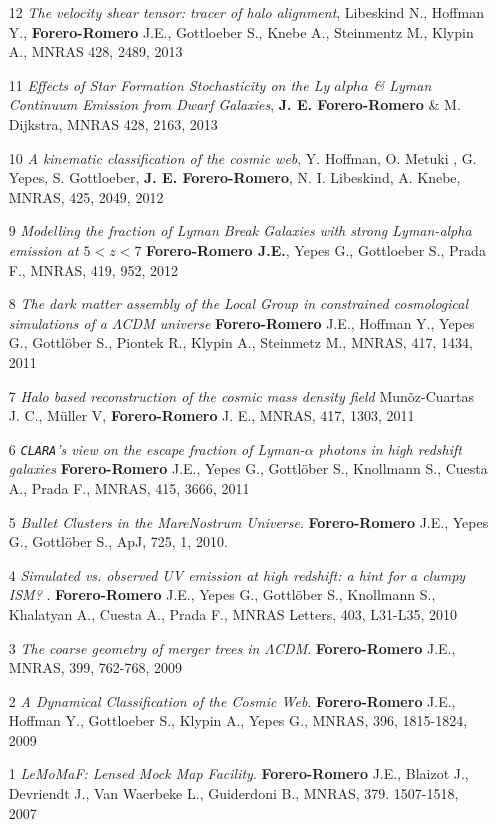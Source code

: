 \documentclass[9pt]{article}
\begin{document}
\begin{enumerate}
\item[12] {\it The velocity shear tensor: tracer of halo alignment},
  Libeskind N., Hoffman Y., {\bf Forero-Romero} J.E., Gottloeber S.,
  Knebe A., Steinmentz M., Klypin A., MNRAS 428, 2489, 2013 

\item[11] {\it Effects of Star Formation Stochasticity on the Ly
  $alpha$ \& Lyman Continuum Emission from Dwarf Galaxies}, {\bf
  J. E. Forero-Romero} \& M. Dijkstra, MNRAS 428, 2163, 2013 

\item[10] {\it A kinematic classification of the cosmic web},
  Y. Hoffman, O. Metuki , G. Yepes, S. Gottloeber, {\bf
    J. E. Forero-Romero}, N. I. Libeskind, A. Knebe, MNRAS, 425, 2049,
  2012 

\item[9] {\it Modelling the fraction of Lyman Break Galaxies with
  strong Lyman-alpha emission at $5 < z < 7$} {\bf Forero-Romero
  J.E.}, Yepes G., Gottloeber S., Prada F., MNRAS, 419, 952, 2012 

\item [8]
{\it The dark matter assembly of the Local Group in constrained cosmological
  simulations of a $\Lambda$CDM universe} {\bf Forero-Romero} J.E.,
Hoffman Y., Yepes G., Gottl\"ober S., Piontek R., Klypin A., Steinmetz
M.,  MNRAS, 417, 1434, 2011 

\item[7] 
{\it Halo based reconstruction of the cosmic mass density field}
Mun\~oz-Cuartas J. C., M\"uller V, {\bf Forero-Romero} J. E.,
MNRAS, 417, 1303, 2011 
 
\item [6]
{\it {\tt CLARA}'s view on the escape fraction of Lyman-$\alpha$ photons in
  high redshift galaxies}
{\bf Forero-Romero} J.E., Yepes G., Gottl\"ober S., Knollmann S., Cuesta A., Prada F.,  
MNRAS, 415, 3666, 2011

\item [5]
{\it Bullet Clusters in the MareNostrum Universe}. 
{\bf Forero-Romero} J.E., Yepes G., Gottl\"ober S., 
ApJ, 725, 1, 2010.

\item [4]
{\it Simulated vs. observed UV emission at high redshift: a hint for a clumpy
ISM? }. 
{\bf Forero-Romero} J.E., Yepes G., Gottl\"ober S., Knollmann S., Khalatyan A., Cuesta A., Prada F.,   MNRAS Letters, 403,  L31-L35, 2010

\item [3]
{\it The coarse geometry of merger trees in
  $\Lambda$CDM}.  {\bf Forero-Romero} J.E., 
MNRAS, 399, 762-768, 2009

\item [2]
{\it A Dynamical Classification of the  Cosmic Web}.  {\bf Forero-Romero} J.E., Hoffman Y.,  Gottloeber S., Klypin A., Yepes G.,
MNRAS, 396, 1815-1824, 2009

\item [1] 
{\it {\sc LeMoMaF}:  Lensed Mock Map Facility}. 
{\bf Forero-Romero} J.E., Blaizot J., Devriendt J., Van Waerbeke L., Guiderdoni B., 
MNRAS, 379. 1507-1518, 2007
\end{enumerate}
\end{document}
